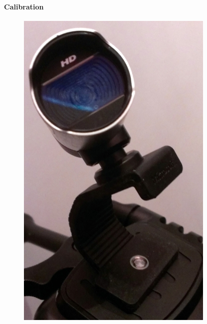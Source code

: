 \documentclass{scrartcl}
\begin{document}
\paragraph{Calibration}


\begin{figure}[H]
\centering
\begin{minipage}{.5\textwidth}
  \centering
  \includegraphics[width=.8\linewidth]{img/rotation.jpg}
\end{minipage}%
\begin{minipage}{.5\textwidth}
  \centering

\end{minipage}
\end{figure}
\end{document}
